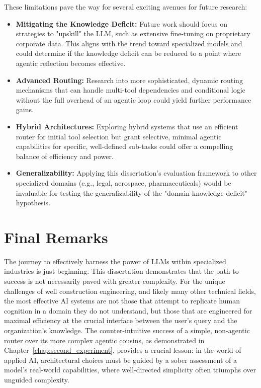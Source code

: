     These limitations pave the way for several exciting avenues for future research:

    \begin{itemize}
        \item \textbf{Mitigating the Knowledge Deficit:} Future work should focus on strategies to "upskill" the LLM, such as extensive fine-tuning on proprietary corporate data. This aligns with the trend toward specialized models \citep{Shah2024, Meena2023, Ghosh2023} and could determine if the knowledge deficit can be reduced to a point where agentic reflection becomes effective.
        \item \textbf{Advanced Routing:} Research into more sophisticated, dynamic routing mechanisms that can handle multi-tool dependencies and conditional logic without the full overhead of an agentic loop could yield further performance gains.
        \item \textbf{Hybrid Architectures:} Exploring hybrid systems that use an efficient router for initial tool selection but grant selective, minimal agentic capabilities for specific, well-defined sub-tasks could offer a compelling balance of efficiency and power.
        \item \textbf{Generalizability:} Applying this dissertation's evaluation framework to other specialized domains (e.g., legal, aerospace, pharmaceuticals) would be invaluable for testing the generalizability of the "domain knowledge deficit" hypothesis.
    \end{itemize}

\section{Final Remarks}
\label{sec:conclusion_final}

    The journey to effectively harness the power of LLMs within specialized industries is just beginning. This dissertation demonstrates that the path to success is not necessarily paved with greater complexity. For the unique challenges of well construction engineering, and likely many other technical fields, the most effective AI systems are not those that attempt to replicate human cognition in a domain they do not understand, but those that are engineered for maximal efficiency at the crucial interface between the user's query and the organization's knowledge. The counter-intuitive success of a simple, non-agentic router over its more complex agentic cousins, as demonstrated in Chapter~\ref{chap:second_experiment}, provides a crucial lesson: in the world of applied AI, architectural choices must be guided by a sober assessment of a model's real-world capabilities, where well-directed simplicity often triumphs over unguided complexity.
